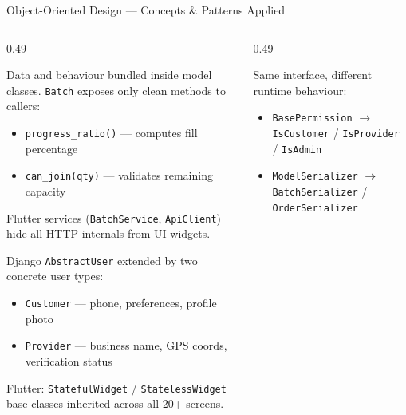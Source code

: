 \documentclass[aspectratio=169,12pt]{beamer}
\begin{document}
\begin{frame}{Object-Oriented Design --- Concepts \& Patterns Applied}
\vspace{0.06cm}
\begin{columns}[T]
\begin{column}{0.49\textwidth}

  \begin{tcolorbox}[cardbox,title={Encapsulation}]
    \scriptsize Data and behaviour bundled inside model classes.
    \texttt{Batch} exposes only clean methods to callers:
    \begin{itemize}\setlength\itemsep{1pt}
      \item \texttt{progress\_ratio()} --- computes fill percentage
      \item \texttt{can\_join(qty)} --- validates remaining capacity
    \end{itemize}
    Flutter services (\texttt{BatchService}, \texttt{ApiClient}) hide all HTTP internals from UI widgets.
  \end{tcolorbox}

  \vspace{-0.12cm}

  \begin{tcolorbox}[cardbox,title={Inheritance}]
    \scriptsize Django \texttt{AbstractUser} extended by two concrete user types:
    \begin{itemize}\setlength\itemsep{1pt}
      \item \texttt{Customer} --- phone, preferences, profile photo
      \item \texttt{Provider} --- business name, GPS coords, verification status
    \end{itemize}
    Flutter: \texttt{StatefulWidget} / \texttt{StatelessWidget} base classes inherited across all 20+ screens.
  \end{tcolorbox}

\end{column}
\begin{column}{0.49\textwidth}

  \begin{tcolorbox}[orangecard,title={Polymorphism}]
    \scriptsize Same interface, different runtime behaviour:
    \begin{itemize}\setlength\itemsep{1pt}
      \item \texttt{BasePermission} $\to$ \texttt{IsCustomer} / \texttt{IsProvider} / \texttt{IsAdmin}
      \item \texttt{ModelSerializer} $\to$ \texttt{BatchSerializer} / \texttt{OrderSerializer}
    \end{itemize}
  \end{tcolorbox}


\end{column}
\end{columns}
\end{frame}
\end{document}

